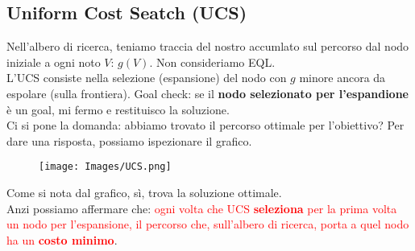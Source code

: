 \documentclass{article}
\begin{document}
\subsection{Uniform Cost Seatch (UCS)}
Nell'albero di ricerca, teniamo traccia del nostro accumlato sul percorso dal nodo iniziale a ogni noto $V$: $g(V)$. Non consideriamo EQL. \\
L'UCS consiste nella selezione (espansione) del nodo con $g$ minore ancora da espolare (sulla frontiera). Goal check: se il \textbf{nodo selezionato per l'espandione} è un goal, mi fermo e restituisco la soluzione. \\
Ci si pone la domanda: abbiamo trovato il percorso ottimale per l'obiettivo? Per dare una risposta, possiamo ispezionare il grafico.
\begin{figure}[H]
    \centering
    \texttt{[image: Images/UCS.png]}
\end{figure}
Come si nota dal grafico, sì, trova la soluzione ottimale.
\\
Anzi possiamo affermare che: \textcolor{red}{ogni volta che UCS \textbf{seleziona} per la prima volta un nodo per l'espansione, il percorso che, sull'albero di ricerca, porta a quel nodo ha un \textbf{costo minimo}}. 
\end{document}

